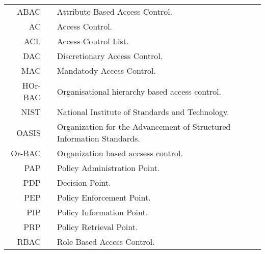 \begin{center}
	\begin{tabular}[t]{rp{5mm}p{12cm}}
		ABAC && Attribute Based Access Control.\\
        AC && Access Control.\\
        ACL && Access Control List.\\
        DAC && Discretionary Access Control.\\
        MAC && Mandatody Access Control.\\
        HOr-BAC && Organisational hierarchy based access control. \\
		NIST && National Institute of Standards and Technology.\\
		OASIS && Organization for the Advancement of Structured Information Standards.\\
		Or-BAC && Organization based accsess control. \\
		PAP && Policy Administration Point.\\
		PDP &&  Decision Point.\\
		PEP && Policy Enforcement Point.\\
	    PIP && Policy Information Point.\\
		PRP && Policy Retrieval Point.\\
		RBAC && Role Based Access Control.\\
	\end{tabular}
\end{center}
